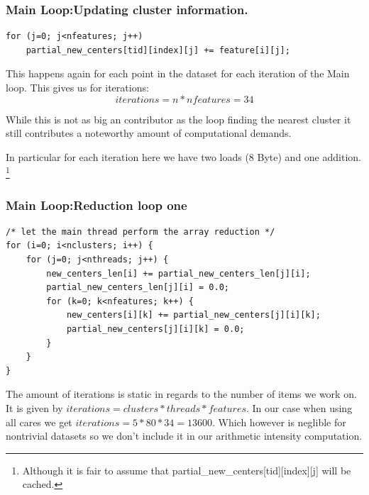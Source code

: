 \documentclass[]{article}
\begin{document}
\subsubsection{Main Loop:Updating cluster information.}
\begin{lstlisting}[caption={Updating (partial) cluster information},label=lblUpdPartClst]
for (j=0; j<nfeatures; j++)
	partial_new_centers[tid][index][j] += feature[i][j];
\end{lstlisting}
This happens again for each point in the dataset for each iteration of the Main loop.
This gives us for iterations:
$$iterations = n * nfeatures = 34$$

While this is not as big an contributor as the loop finding the nearest cluster
it still contributes a noteworthy amount of computational demands.

In particular for each iteration here we have two loads (8 Byte) and one addition.
\footnote{Although it is fair to assume that partial\_new\_centers[tid][index][j] will be cached.}


\subsubsection{Main Loop:Reduction loop one}
\begin{lstlisting}[caption={Reduction pt1}]
/* let the main thread perform the array reduction */
for (i=0; i<nclusters; i++) {
	for (j=0; j<nthreads; j++) {
		new_centers_len[i] += partial_new_centers_len[j][i];
		partial_new_centers_len[j][i] = 0.0;
		for (k=0; k<nfeatures; k++) {
			new_centers[i][k] += partial_new_centers[j][i][k];
			partial_new_centers[j][i][k] = 0.0;
		}
	}
}
\end{lstlisting}

The amount of iterations is static in regards to the number of items we work on.
It is given by $ iterations = clusters * threads * features$.
In our case when using all cares we get $ iterations = 5 * 80  * 34 = 13600$.
Which however is neglible for nontrivial datasets so we don't include it in our arithmetic intensity computation. 

%
%
\end{document}
